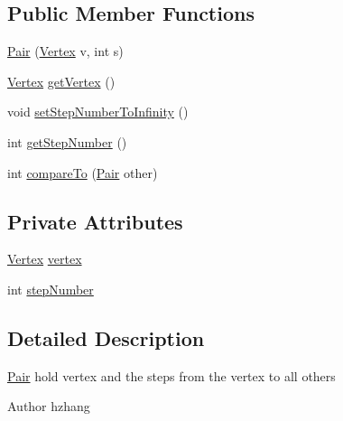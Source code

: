 \subsection*{Public Member Functions}
\begin{DoxyCompactItemize}
\item 
\hyperlink{classmain_1_1java_1_1com_1_1company_1_1dijkstratest_1_1_pair_a211595a122698caf689814de3104723b}{Pair} (\hyperlink{classmain_1_1java_1_1com_1_1company_1_1dijkstratest_1_1_vertex}{Vertex} v, int s)
\item 
\hyperlink{classmain_1_1java_1_1com_1_1company_1_1dijkstratest_1_1_vertex}{Vertex} \hyperlink{classmain_1_1java_1_1com_1_1company_1_1dijkstratest_1_1_pair_a84296cc6eaa19d0f50f8ca98a7c98639}{get\-Vertex} ()
\item 
void \hyperlink{classmain_1_1java_1_1com_1_1company_1_1dijkstratest_1_1_pair_aede90e0406606c28b1565dafcf2cedda}{set\-Step\-Number\-To\-Infinity} ()
\item 
int \hyperlink{classmain_1_1java_1_1com_1_1company_1_1dijkstratest_1_1_pair_a05b2374c70c937227f898b1cea0fe910}{get\-Step\-Number} ()
\item 
int \hyperlink{classmain_1_1java_1_1com_1_1company_1_1dijkstratest_1_1_pair_adf087853df8cae9edc2c5b206e98a740}{compare\-To} (\hyperlink{classmain_1_1java_1_1com_1_1company_1_1dijkstratest_1_1_pair}{Pair} other)
\end{DoxyCompactItemize}
\subsection*{Private Attributes}
\begin{DoxyCompactItemize}
\item 
\hyperlink{classmain_1_1java_1_1com_1_1company_1_1dijkstratest_1_1_vertex}{Vertex} \hyperlink{classmain_1_1java_1_1com_1_1company_1_1dijkstratest_1_1_pair_a1060ef3a7196fae57fde28c911ad02a0}{vertex}
\item 
int \hyperlink{classmain_1_1java_1_1com_1_1company_1_1dijkstratest_1_1_pair_a4bc5c040004202d37e76798124cb1624}{step\-Number}
\end{DoxyCompactItemize}


\subsection{Detailed Description}
\hyperlink{classmain_1_1java_1_1com_1_1company_1_1dijkstratest_1_1_pair}{Pair} hold vertex and the steps from the vertex to all others \begin{DoxyAuthor}{Author}
hzhang 
\end{DoxyAuthor}


